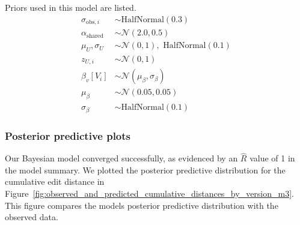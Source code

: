 Priors used in this model are listed.
\begin{align}
    \sigma_{\text{obs},i} &\sim \text{HalfNormal}(0.3) \label{eq:model3_prior_sigma} \\
    \alpha_{\text{shared}} &\sim \mathcal{N}(2.0, 0.5) \label{eq:model3_prior_shared} \\
    \mu_{U}, \sigma_{U} &\sim \mathcal{N}(0, 1), \text{ HalfNormal}(0.1) \label{eq:model3_prior_user} \\
    z_{U,i} &\sim \mathcal{N}(0, 1) \label{eq:model3_prior_z} \\
    \beta_v[V_i] &\sim \mathcal{N}(\mu_{\beta}, \sigma_{\beta}) \label{eq:model3_prior_beta} \\
    \mu_{\beta} &\sim \mathcal{N}(0.05, 0.05) \label{eq:model3_prior_beta_mu}\\
    \sigma_{\beta} &\sim \text{HalfNormal}(0.1) \label{eq:model3_prior_beta_sigma}
\end{align}

\subsubsection{Posterior predictive plots}
Our Bayesian model converged successfully, as evidenced by an $\hat{R}$ value of 1 in the model summary. We plotted the posterior predictive distribution for the cumulative edit distance in Figure~\ref{fig:observed_and_predicted_cumulative_distances_by_version_m3}. This figure compares the models posterior predictive distribution with the observed data.

